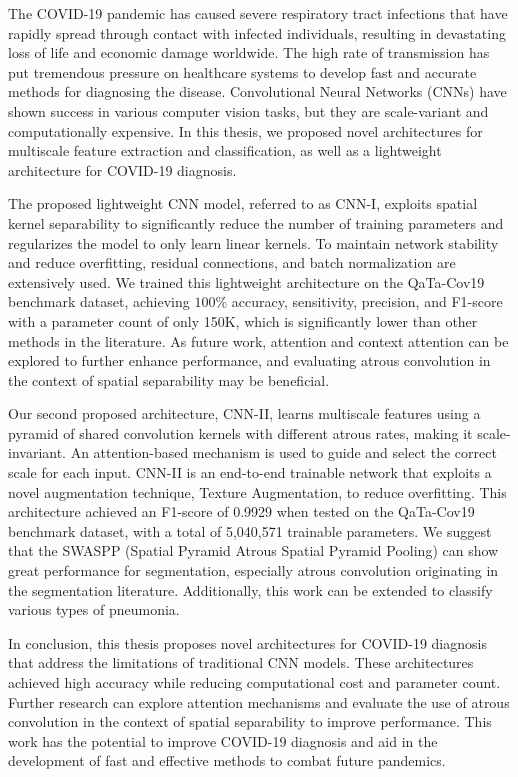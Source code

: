 The COVID-19 pandemic has caused severe respiratory tract infections that have rapidly spread through contact with infected individuals, resulting in devastating loss of life and economic damage worldwide. The high rate of transmission has put tremendous pressure on healthcare systems to develop fast and accurate methods for diagnosing the disease. Convolutional Neural Networks (CNNs) have shown success in various computer vision tasks, but they are scale-variant and computationally expensive. In this thesis, we proposed novel architectures for multiscale feature extraction and classification, as well as a lightweight architecture for COVID-19 diagnosis.

The proposed lightweight CNN model, referred to as CNN-I, exploits spatial kernel separability to significantly reduce the number of training parameters and regularizes the model to only learn linear kernels. To maintain network stability and reduce overfitting, residual connections, and batch normalization are extensively used. We trained this lightweight architecture on the QaTa-Cov19 benchmark dataset, achieving $100\%$ accuracy, sensitivity, precision, and F1-score with a parameter count of only 150K, which is significantly lower than other methods in the literature. As future work, attention and context attention can be explored to further enhance performance, and evaluating atrous convolution in the context of spatial separability may be beneficial.

Our second proposed architecture, CNN-II, learns multiscale features using a pyramid of shared convolution kernels with different atrous rates, making it scale-invariant. An attention-based mechanism is used to guide and select the correct scale for each input. CNN-II is an end-to-end trainable network that exploits a novel augmentation technique, Texture Augmentation, to reduce overfitting. This architecture achieved an F1-score of 0.9929 when tested on the QaTa-Cov19 benchmark dataset, with a total of 5,040,571 trainable parameters. We suggest that the SWASPP (Spatial Pyramid Atrous Spatial Pyramid Pooling) can show great performance for segmentation, especially atrous convolution originating in the segmentation literature. Additionally, this work can be extended to classify various types of pneumonia.

In conclusion, this thesis proposes novel architectures for COVID-19 diagnosis that address the limitations of traditional CNN models. These architectures achieved high accuracy while reducing computational cost and parameter count. Further research can explore attention mechanisms and evaluate the use of atrous convolution in the context of spatial separability to improve performance. This work has the potential to improve COVID-19 diagnosis and aid in the development of fast and effective methods to combat future pandemics.